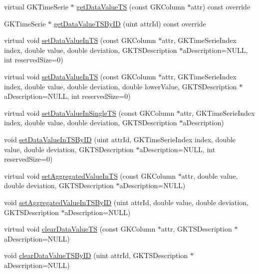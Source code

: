 \begin{DoxyCompactItemize}
virtual G\+K\+Time\+Serie $\ast$ \hyperlink{classGKObject_ae5fa8b85141b85a1798b30410ecb7f55}{get\+Data\+Value\+TS} (const G\+K\+Column $\ast$attr) const override
\item 
G\+K\+Time\+Serie $\ast$ \hyperlink{classGKObject_a2a8110072139986e2481f9d47bd929f8}{get\+Data\+Value\+T\+S\+By\+ID} (uint attr\+Id) const override
\item 
virtual void \hyperlink{classGKObject_a7b0fa4fc85a6578f9bf330eed5ba53fa}{set\+Data\+Value\+In\+TS} (const G\+K\+Column $\ast$attr, G\+K\+Time\+Serie\+Index index, double value, double deviation, G\+K\+T\+S\+Description $\ast$a\+Description=N\+U\+LL, int reserved\+Size=0)
\item 
virtual void \hyperlink{classGKObject_aa84235c157d2ace0199e883af58fa525}{set\+Data\+Value\+In\+TS} (const G\+K\+Column $\ast$attr, G\+K\+Time\+Serie\+Index index, double value, double deviation, double lower\+Value, G\+K\+T\+S\+Description $\ast$a\+Description=N\+U\+LL, int reserved\+Size=0)
\item 
virtual void \hyperlink{classGKObject_af5e9500d0a9decb5b7e8c4ee7edaf515}{set\+Data\+Value\+In\+Single\+TS} (const G\+K\+Column $\ast$attr, G\+K\+Time\+Serie\+Index index, double value, double deviation, G\+K\+T\+S\+Description $\ast$a\+Description)
\item 
void \hyperlink{classGKObject_aac2f7a2ab000092ba6fc25c0d1476df0}{set\+Data\+Value\+In\+T\+S\+By\+ID} (uint attr\+Id, G\+K\+Time\+Serie\+Index index, double value, double deviation, G\+K\+T\+S\+Description $\ast$a\+Description=N\+U\+LL, int reserved\+Size=0)
\item 
virtual void \hyperlink{classGKObject_a7260240cd9e4a6a2b3b85b652f12be40}{set\+Aggregated\+Value\+In\+TS} (const G\+K\+Column $\ast$attr, double value, double deviation, G\+K\+T\+S\+Description $\ast$a\+Description=N\+U\+LL)
\item 
void \hyperlink{classGKObject_aa33240228fa2412eb744bf790484bb2a}{set\+Aggregated\+Value\+In\+T\+S\+By\+ID} (uint attr\+Id, double value, double deviation, G\+K\+T\+S\+Description $\ast$a\+Description=N\+U\+LL)
\item 
virtual void \hyperlink{classGKObject_a5a15db6ec28dcdcd8d5428de0a648a60}{clear\+Data\+Value\+TS} (const G\+K\+Column $\ast$attr, G\+K\+T\+S\+Description $\ast$a\+Description=N\+U\+LL)
\item 
void \hyperlink{classGKObject_a966b14e3eda905eb950bd8e4a0c627dc}{clear\+Data\+Value\+T\+S\+By\+ID} (uint attr\+Id, G\+K\+T\+S\+Description $\ast$a\+Description=N\+U\+LL)
\item 

\end{DoxyCompactItemize}
